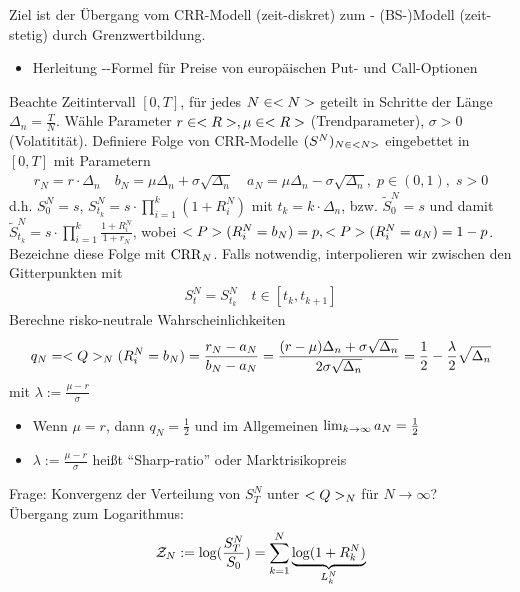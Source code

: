 Ziel ist der Übergang vom CRR-Modell (zeit-diskret) zum - (BS-)Modell (zeit-stetig) durch Grenzwertbildung.
\begin{itemize}
	\item Herleitung --Formel für Preise von europäischen Put- und Call-Optionen
\end{itemize}
Beachte Zeitintervall $[0,T]$, für jedes $N \in \N$ geteilt in Schritte der Länge $\Delta_n = \frac{T}{N}$. Wähle Parameter $r \in \R, \mu \in \R$ (Trendparameter), $\sigma > 0$ (Volatitität). Definiere Folge von CRR-Modelle $(S^N)_{N \in \N}$ eingebettet in $[0,T]$ mit Parametern
\begin{align*}
	r_N = r \cdot \Delta_n \quad b_N = \mu \Delta_n + \sigma \sqrt{\Delta_n}\quad a_N = \mu \Delta_n - \sigma \sqrt{\Delta_n},\;p \in (0,1),\;s> 0
\end{align*}
d.h. $S^N_0 = s$, $S^N_{t_k} = s \cdot \prod_{i=1}^k (1+R_i^N)$ mit $t_k = k \cdot \Delta_n$, bzw. $\tilde{S}_0^N = s$ und damit $\tilde{S}^N_{t_k}= s \cdot \prod_{i=1}^k \frac{1+R_i^N}{1+r_N}$, wobei $\P(R^N_i = b_N) = p, \P(R^N_i = a_N) = 1-p$.
Bezeichne diese Folge mit $\CRR_N$. Falls notwendig, interpolieren wir zwischen den Gitterpunkten mit
\begin{align*}
	S_t^N = S^N_{t_k} \quad t \in [t_k,t_{k+1}]
\end{align*}
Berechne risko-neutrale Wahrscheinlichkeiten
\begin{align*}
	q_N = \QQ_N(R_i^N = b_N) = \frac{r_N - a_N}{b_N - a_N} = \frac{(r-\mu)\Delta_n + \sigma \sqrt{\Delta_n}}{2\sigma\sqrt{\Delta_n}} = \frac{1}{2} - \frac{\lambda}{2}\sqrt{\Delta_n}
\end{align*}
mit $\lambda := \frac{\mu - r}{\sigma}$
\begin{*remark}
	\begin{itemize}
		\item Wenn $\mu = r$, dann $q_N = \frac{1}{2}$ und im Allgemeinen $\lim_{k \to \infty}a_N = \half$
		\item $\lambda := \frac{\mu - r}{\sigma}$ heißt ``Sharp-ratio'' oder Marktrisikopreis
	\end{itemize}
\end{*remark}
Frage: Konvergenz der Verteilung von $S^N_T$ unter $\QQ_N$ für $N \to \infty$?\\
Übergang zum Logarithmus:
\begin{align*}
	\ZZ_N := \log(\frac{S^N_T}{S_0}) = \sum_{k=1}^N \underbrace{\log(1+R_k^N)}_{L^N_k}
\end{align*}
